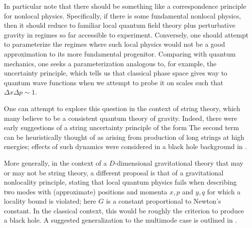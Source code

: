 In particular note that there should be something like a correspondence principle for nonlocal physics.  Specifically, if there  is some fundamental nonlocal physics, then it should reduce to familiar local quantum field theory plus perturbative gravity in regimes so far accessible to experiment.  Conversely, one should attempt to parameterize the regimes where such local physics would not be a good approximation to its more fundamental progenitor.  Comparing with quantum mechanics, one seeks a parameterization analogous to, for example, the uncertainty principle, which tells us that classical phase space gives way to quantum wave functions when we attempt to probe it on scales such that $\Delta x\Delta p\sim 1$.  

One can attempt to explore this question in the context of string theory, which many believe to be a consistent quantum theory of gravity.  Indeed, there were early suggestions of a  string uncertainty principle of the form 
%
\eqn{}
%
The second term can be heuristically thought of as arising from production of long strings at high energies; effects of such dynamics were considered in a black hole background  in .

More generally, in the context of a $D$-dimensional gravitational theory that may or may not be string theory, a different proposal  is that of a  gravitational nonlocality principle, stating that local quantum physics fails when describing two modes with (approximate) positions and momenta $x,p$ and $y,q$ for which a locality bound 
%
\eqn{}
%
is violated; here $G$ is a constant proportional to Newton's constant.  In the classical context, this would be roughly the criterion to produce a black hole.  A suggested generalization to the multimode case is outlined in .

